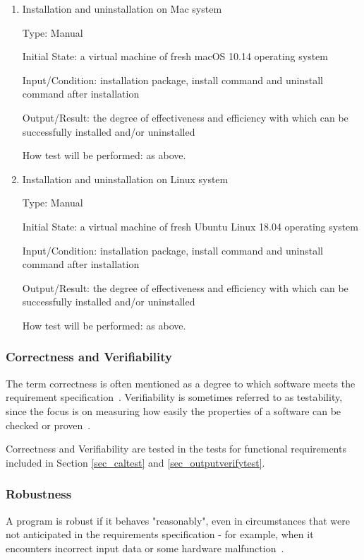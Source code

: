 \documentclass[12pt, titlepage]{article}
\begin{document}
\begin{enumerate}
\item{Installation and uninstallation on Mac system}

Type: Manual
					
Initial State: a virtual machine of fresh macOS 10.14 operating system
					
Input/Condition: \progname{} installation package, install command and uninstall command after installation
					
Output/Result: the degree of effectiveness and efficiency
with which \progname{} can be successfully installed and/or uninstalled
					
How test will be performed: as above.

\item{Installation and uninstallation on Linux system}

Type: Manual
					
Initial State: a virtual machine of fresh Ubuntu Linux 18.04 operating system
					
Input/Condition: \progname{} installation package, install command and uninstall command after installation
					
Output/Result: the degree of effectiveness and efficiency
with which \progname{} can be successfully installed and/or uninstalled
					
How test will be performed: as above.
\end{enumerate}

\subsubsection{Correctness and Verifiability}
\label{sec_correctverfiabletest}

The term correctness is often mentioned as a degree to which software meets the requirement specification~\cite{IEEE1990}.  Verifiability is sometimes referred to as testability, since the focus is on measuring how easily the properties of a software can be checked or proven~\cite{SmithEtAl2018}.
		
Correctness and Verifiability are tested in the tests for functional requirements included in Section \ref{sec_caltest} and \ref{sec_outputverifytest}.

\subsubsection{Robustness}
\label{sec_robustnesstest}
A program is robust if it behaves "reasonably", even in circumstances that were not anticipated in the requirements specification - for example, when it encounters incorrect input data or some hardware malfunction~\cite{Ghezzi1991}.
\end{document}
